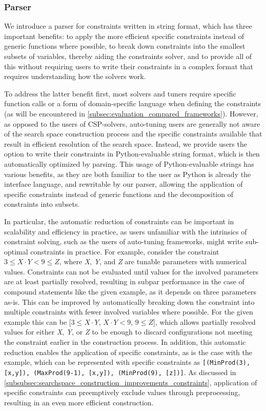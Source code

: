\subsubsection{Parser} \label{subsubsec:searchspace_construction_improvements_parser}
We introduce a parser for constraints written in string format, which has three important benefits: to apply the more efficient specific constraints instead of generic functions where possible, to break down constraints into the smallest subsets of variables, thereby aiding the constraints solver, and to provide all of this without requiring users to write their constraints in a complex format that requires understanding how the solvers work. 

To address the latter benefit first, most solvers and tuners require specific function calls or a form of domain-specific language when defining the constraints (as will be encountered in \cref{subsec:evaluation_compared_frameworks}). However, as opposed to the users of CSP-solvers, auto-tuning users are generally not aware of the search space construction process and the specific constraints available that result in efficient resolution of the search space. 
Instead, we provide users the option to write their constraints in Python-evaluable string format, which is then automatically optimized by parsing. 
This usage of Python-evaluable strings has various benefits, as they are both familiar to the user as Python is already the interface language, and rewritable by our parser, allowing the application of specific constraints instead of generic functions and the decomposition of constraints into subsets. 

In particular, the automatic reduction of constraints can be important in scalability and efficiency in practice, as users unfamiliar with the intrinsics of constraint solving, such as the users of auto-tuning frameworks, might write sub-optimal constraints in practice. 
For example, consider the constraint $3 \leq X \cdot Y < 9 \leq Z$, where \textit{X}, \textit{Y}, and \textit{Z} are tunable parameters with numerical values. 
Constraints can not be evaluated until values for the involved parameters are at least partially resolved, resulting in subpar performance in the case of compound statements like the given example, as it depends on three parameters as-is. 
This can be improved by automatically breaking down the constraint into multiple constraints with fewer involved variables where possible. 
For the given example this can be [$3 \leq X \cdot Y$, $X \cdot Y < 9 $, $9 \leq Z$], which allows partially resolved values for either \textit{X}, \textit{Y}, or \textit{Z} to be enough to discard configurations not meeting the constraint earlier in the construction process. 
In addition, this automatic reduction enables the application of specific constraints, as is the case with the example, which can be represented with specific constraints as \lstinline{[(MinProd(3), [x,y]), (MaxProd(9-1), [x,y]), (MinProd(9), [z])]}. As discussed in \cref{subsubsec:searchspace_construction_improvements_constraints}, application of specific constraints can preemptively exclude values through preprocessing, resulting in an even more efficient construction. 

